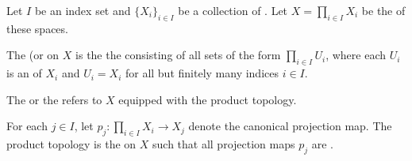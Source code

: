 \begin{definition} \label{definition:product_topology_on_a_cartesian_product_of_topological_spaces}
Let $I$ be an index set and $\{X_i\}_{i \in I}$ be a collection of . Let $X = \prod_{i \in I} X_i$ be the  of these spaces. 

    The  (or  on $X$ is the  the  consisting of all sets of the form $\prod_{i \in I} U_i$, where each $U_i$ is an  of $X_i$ and $U_i = X_i$ for all but finitely many indices $i \in I$.

    The  or the  refers to $X$ equipped with the product topology. 

    For each $j \in I$, let $p_j: \prod_{i \in I} X_i \to X_j$ denote the canonical projection map. The product topology is the  on $X$ such that all projection maps $p_j$ are .
\end{definition}